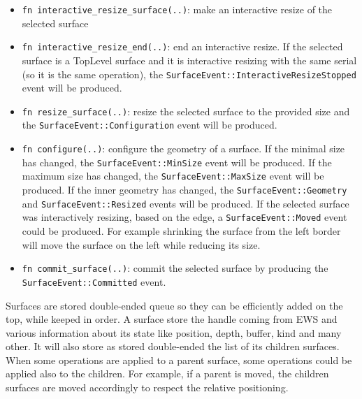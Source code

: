 \begin{itemize}
	\item \lstinline|fn interactive_resize_surface(..)|: make an interactive resize of the selected surface
	
	\item \lstinline|fn interactive_resize_end(..)|: end an interactive resize. If the selected surface is a TopLevel surface and it is interactive resizing with the same serial (so it is the same operation), the \lstinline|SurfaceEvent::InteractiveResizeStopped| event will be produced.
	
	\item \lstinline|fn resize_surface(..)|: resize the selected surface to the provided size and the \lstinline|SurfaceEvent::Configuration| event will be produced.
	
	\item \lstinline|fn configure(..)|: configure the geometry of a surface. If the minimal size has changed, the \lstinline|SurfaceEvent::MinSize| event will be produced. If the maximum size has changed, the \lstinline|SurfaceEvent::MaxSize| event will be produced. If the inner geometry has changed, the \lstinline|SurfaceEvent::Geometry| and \lstinline|SurfaceEvent::Resized| events will be produced. If the selected surface was interactively resizing, based on the edge, a \lstinline|SurfaceEvent::Moved| event could be produced. For example shrinking the surface from the left border will move the surface on the left while reducing its size.
	
	\item \lstinline|fn commit_surface(..)|: commit the selected surface by producing the \lstinline|SurfaceEvent::Committed| event.
\end{itemize}
Surfaces are stored double-ended queue so they can be efficiently added on the top, while keeped in order. A surface store the handle coming from EWS and various information about its state like position, depth, buffer, kind and many other. It will also store as stored double-ended the list of its children surfaces. When some operations are applied to a parent surface, some operations could be applied also to the children. For example, if a parent is moved, the children surfaces are moved accordingly to respect the relative positioning.

\newpage
